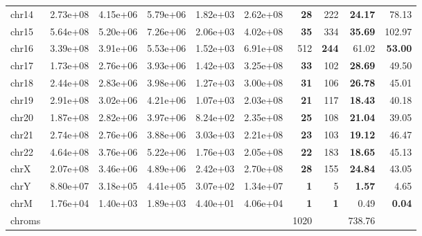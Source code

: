 \begin{table*}[!ht]
\begin{tabular}{@{}lrrrrrrrrr@{}}
		chr14 & 2.73e+08 & 4.15e+06 & 5.79e+06 & 1.82e+03 & 2.62e+08 & \textbf{28} & 222 & \textbf{24.17} & 78.13 \\ 
		chr15 & 5.64e+08 & 5.20e+06 & 7.26e+06 & 2.06e+03 & 4.02e+08 & \textbf{35} & 334 & \textbf{35.69} & 102.97 \\ 
		chr16 & 3.39e+08 & 3.91e+06 & 5.53e+06 & 1.52e+03 & 6.91e+08 & 512 & \textbf{244} & 61.02 & \textbf{53.00} \\ 
		chr17 & 1.73e+08 & 2.76e+06 & 3.93e+06 & 1.42e+03 & 3.25e+08 & \textbf{33} & 102 & \textbf{28.69} & 49.50 \\ 
		chr18 & 2.44e+08 & 2.83e+06 & 3.98e+06 & 1.27e+03 & 3.00e+08 & \textbf{31} & 106 & \textbf{26.78} & 45.01 \\ 
		chr19 & 2.91e+08 & 3.02e+06 & 4.21e+06 & 1.07e+03 & 2.03e+08 & \textbf{21} & 117 & \textbf{18.43} & 40.18 \\ 
		chr20 & 1.87e+08 & 2.82e+06 & 3.97e+06 & 8.24e+02 & 2.35e+08 & \textbf{25} & 108 & \textbf{21.04} & 39.05 \\ 
		chr21 & 2.74e+08 & 2.76e+06 & 3.88e+06 & 3.03e+03 & 2.21e+08 & \textbf{23} & 103 & \textbf{19.12} & 46.47 \\ 
		chr22 & 4.64e+08 & 3.76e+06 & 5.22e+06 & 1.76e+03 & 2.05e+08 & \textbf{22} & 183 & \textbf{18.65} & 45.13 \\ 
		chrX & 2.07e+08 & 3.46e+06 & 4.89e+06 & 2.42e+03 & 2.70e+08 & \textbf{28} & 155 & \textbf{24.84} & 43.05 \\ 
		chrY & 8.80e+07 & 3.18e+05 & 4.41e+05 & 3.07e+02 & 1.34e+07 & \textbf{1} & 5 & \textbf{1.57} & 4.65 \\ 
		chrM & 1.76e+04 & 1.40e+03 & 1.89e+03 & 4.40e+01 & 4.06e+04 & \textbf{1} & \textbf{1} & 0.49 & \textbf{0.04}  \\ 
		chroms & & & & &  & 1020 &  & 738.76 & \\
		\bottomrule
	\end{tabular}
\end{table*}